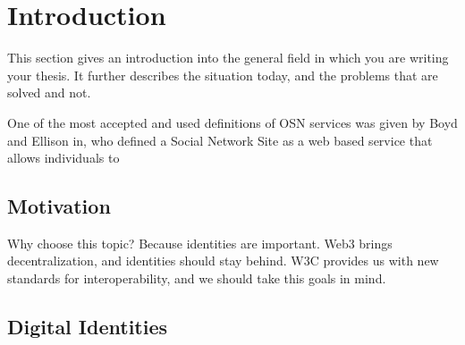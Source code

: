 \chapter{Introduction}
\label{cha:introduction}

This section gives an introduction into the general field in which you are writing your thesis. It further describes the situation today, and the problems that are solved and not.
 
One of the most accepted and used definitions of OSN services was given by Boyd and Ellison in, who defined a Social Network Site  as a web based service that allows individuals to

\section{Motivation}
Why choose this topic? Because identities are important.
Web3 brings decentralization, and identities should stay behind. W3C provides us with new standards for interoperability, and we should take this goals in mind. \cite{FakePaper11}

 
\section{Digital Identities}

 
 
 
 
